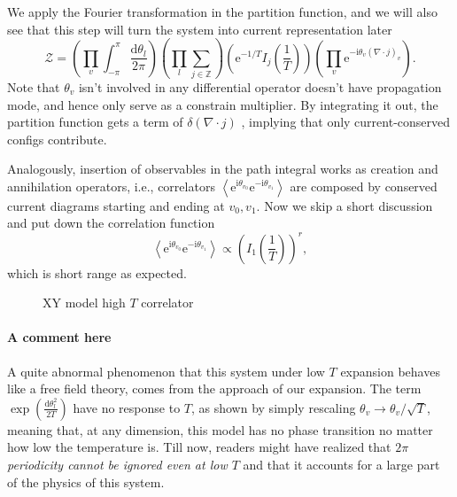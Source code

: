 We apply the Fourier transformation in the partition function, and we will also see that this step will turn the system into current representation later
\begin{equation}
  \mathcal{Z} = \left( \prod_{v}  \int _{-\pi }^{\pi } \frac{\mathrm{d} \theta_{l}}{2\pi } \right) \left( \prod_{l} \sum_{j \in \mathbb{Z}}  \right) \left( \mathrm{e}^{- 1 / T} I_{j}\left( \frac{1}{T} \right) \right) \left( \prod_{v} \mathrm{e}^{-\mathrm{i} \theta_{v} \left( \nabla \cdot j \right)_{v}} \right).
\end{equation}
Note that $\theta_{v}$ isn't involved in any differential operator doesn't have propagation mode, and hence only serve as a constrain multiplier. By integrating it out, the partition function gets a term of $\delta \left( \nabla  \cdot j \right)$ , implying that only current-conserved configs contribute.

Analogously, insertion of observables in the path integral works as creation and annihilation operators, i.e., correlators $\left< \mathrm{e}^{\mathrm{i}\theta_{v_0}} \mathrm{e}^{-\mathrm{i}\theta_{v_1}} \right>$ are composed by conserved current diagrams starting and ending at $v_0, v_1$. Now we skip a short discussion and put down the correlation function
\begin{equation}
  \left< \mathrm{e}^{\mathrm{i}\theta_{v_0}} \mathrm{e}^{-\mathrm{i}\theta_{v_1}} \right> \propto \left( I_1 \left( \frac{1}{T} \right) \right)^{r},
\end{equation}
which is short range as expected.
\begin{figure}[ht]
  \centering
  \caption{XY model high $T$ correlator}
  \label{fig:xy-model-high-t-correlator}
\end{figure}

\paragraph{A comment here} A quite abnormal phenomenon that this system under low $T$ expansion behaves like a free field theory, comes from the approach of our expansion. The term $\exp \left( \frac{\mathrm{d} \theta_{l} ^{2}}{2T} \right)$ have no response to $T$, as shown by simply rescaling $\theta_{v} \to \theta_{v} / \sqrt{T}$, meaning that, at any dimension, this model has no phase transition no matter how low the temperature is. Till now, readers might have realized that \emph{$2\pi $ periodicity cannot be ignored even at low $T$} and that it accounts for a large part of the physics of this system.


